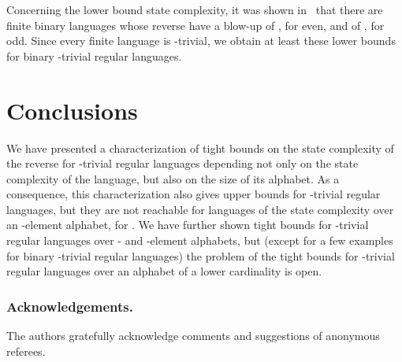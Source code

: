 \documentclass[runningheads]{llncs}
\newcommand{\R}{}
\newcommand{\J}{}
\begin{document}
  Concerning the lower bound state complexity, it was shown in~\cite{CampeanuCSY99} that there are finite binary languages whose reverse have a blow-up of , for  even, and of , for  odd. Since every finite language is \J-trivial, we obtain at least these lower bounds for binary \J-trivial regular languages.

\section{Conclusions}\label{***conclu}
  We have presented a characterization of tight bounds on the state complexity of the reverse for \R-trivial regular languages depending not only on the state complexity of the language, but also on the size of its alphabet. As a consequence, this characterization also gives upper bounds for \J-trivial regular languages, but they are not reachable for languages of the state complexity  over an -element alphabet, for . We have further shown tight bounds for \J-trivial regular languages over - and -element alphabets, but (except for a few examples for binary \J-trivial regular languages) the problem of the tight bounds for \J-trivial regular languages over an alphabet of a lower cardinality is open.

\subsubsection*{Acknowledgements.}
  The authors gratefully acknowledge comments and suggestions of anonymous referees.



\end{document}
